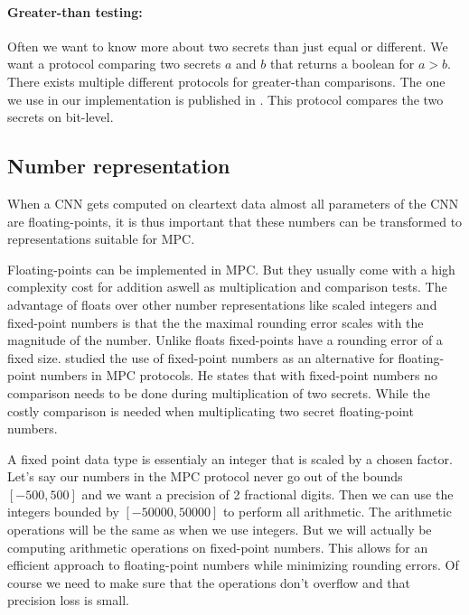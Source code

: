 \paragraph{Greater-than testing:}
Often we want to know more about two secrets than just equal or different. We want a protocol comparing two secrets $a$ and $b$ that returns a boolean for $a>b$. There exists multiple different protocols for greater-than comparisons. The one we use in our implementation is published in \cite{erkin2009privacy}. This protocol compares the two secrets on bit-level.

\subsection{Number representation}
When a CNN gets computed on cleartext data almost all parameters of the CNN are floating-points, it is thus important that these numbers can be transformed to representations suitable for MPC.

Floating-points can be implemented in MPC. But they usually come with a high complexity cost for addition aswell as multiplication and comparison tests. The advantage of floats over other number representations like scaled integers and fixed-point numbers is that the the maximal rounding error scales with the magnitude of the number. Unlike floats fixed-points have a rounding error of a fixed size. \cite{campmans2018optimizing} studied the use of fixed-point numbers as an alternative for floating-point numbers in MPC protocols. He states that with fixed-point numbers no comparison needs to be done during multiplication of two secrets. While the costly comparison is needed when multiplicating two secret floating-point numbers.

A fixed point data type is essentialy an integer that is scaled by a chosen factor. Let's say our numbers in the MPC protocol never go out of the bounds $[-500,500]$ and we want a precision of 2 fractional digits. Then we can use the integers bounded by $[-50000,50000]$ to perform all arithmetic. The arithmetic operations will be the same as when we use integers. But we will actually be computing arithmetic operations on fixed-point numbers. This allows for an efficient approach to floating-point numbers while minimizing rounding errors. Of course we need to make sure that the operations don't overflow and that precision loss is small.

